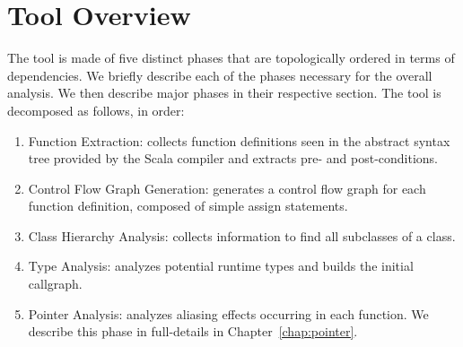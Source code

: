 \chapter{Tool Overview}
\label{chap:overview}
The tool is made of five distinct phases that are topologically ordered in terms
of dependencies. We briefly describe each of the phases necessary for the
overall analysis. We then describe major phases in their respective section.
The tool is decomposed as follows, in order:
\begin{enumerate}
    \item{Function Extraction}: collects function definitions seen in the abstract syntax tree
    provided by the Scala compiler and extracts pre- and post-conditions.

    \item{Control Flow Graph Generation}: generates a control flow graph for each function
    definition, composed of simple assign statements.

    \item{Class Hierarchy Analysis}: collects information to find all subclasses of a class.

    \item{Type Analysis}: analyzes potential runtime types and builds the initial callgraph.

    \item{Pointer Analysis}: analyzes aliasing effects occurring in each
    function. We describe this phase in full-details in
    Chapter~\ref{chap:pointer}.
\end{enumerate}
